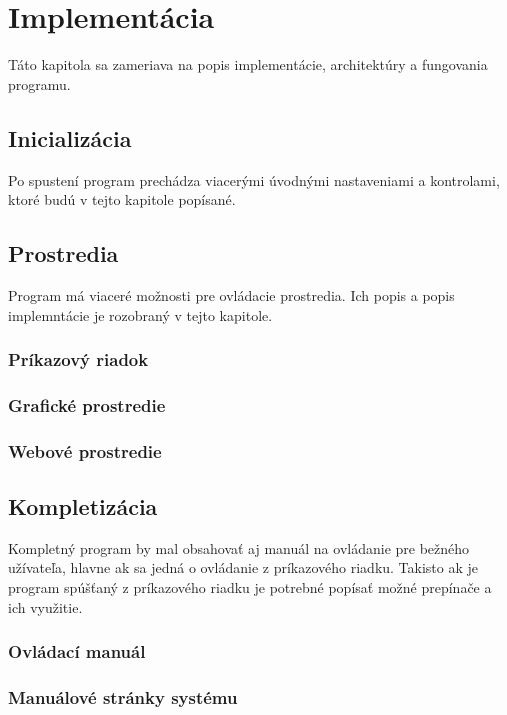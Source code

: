 \chapter{Implementácia}
\label{kap:prog}
Táto kapitola sa zameriava na popis implementácie, architektúry a fungovania programu. 

\section{Inicializácia}
Po spustení program prechádza viacerými úvodnými nastaveniami a kontrolami, ktoré budú
v tejto kapitole popísané.

\section{Prostredia}
Program má viaceré možnosti pre ovládacie prostredia. Ich popis a popis implemntácie je 
rozobraný v tejto kapitole.

\subsection{Príkazový riadok}
\subsection{Grafické prostredie}
\subsection{Webové prostredie}

\section{Kompletizácia}
Kompletný program by mal obsahovať aj manuál na ovládanie pre bežného užívateľa, hlavne ak sa 
jedná o ovládanie z príkazového riadku. Takisto ak je program spúšťaný z príkazového riadku je
potrebné popísať možné prepínače a ich využitie.
\subsection{Ovládací manuál}
\subsection{Manuálové stránky systému}
